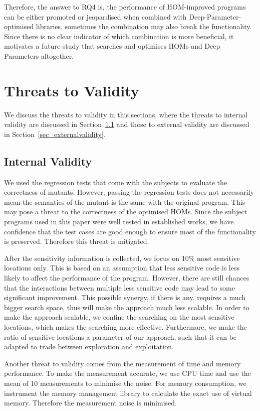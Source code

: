 \documentclass[oribibl]{llncs}
\begin{document}
Therefore, the answer to RQ4 is, the performance of HOM-improved programs can be either promoted or jeopardised when combined with Deep-Parameter-optimised libraries, sometimes the combination may also break the functionality.
Since there is no clear indicator of which combination is more beneficial, it motivates a future study that searches and optimises HOMs and Deep Parameters altogether.

\section{Threats to Validity}
\label{sec_threat}

We discuss the threats to validity in this sections, where the threats to internal validity are discussed in Section~\ref{sec_internalvalidity} and those to external validity are discussed in Section~\ref{sec_externalvalidity}.

\subsection{Internal Validity}
\label{sec_internalvalidity}

We used the regression tests that come with the subjects to evaluate the correctness of mutants.
However, passing the regression tests does not necessarily mean the semantics of the mutant is the same with the original program.
This may pose a threat to the correctness of the optimised HOMs.
Since the subject programs used in this paper were well tested in established works, we have confidence that the test cases are good enough to ensure most of the functionality is preserved.
Therefore this threat is mitigated.

After the sensitivity information is collected, we focus on 10\% most sensitive locations only.
This is based on an assumption that less sensitive code is less likely to affect the performance of the program.
However, there are still chances that the interactions between multiple less sensitive code may lead to some significant improvement.
This possible synergy, if there is any, requires a much bigger search space, thus will make the approach much less scalable.
In order to make the approach scalable, we confine the searching on the most sensitive locations, which makes the searching more effective.
Furthermore, we make the ratio of sensitive locations a parameter of our approach, such that it can be adapted to trade between exploration and exploitation.

Another threat to validity comes from the measurement of time and memory performance.
To make the measurement accurate, we use CPU time and use the mean of 10 measurements to minimise the noise.
For memory consumption, we instrument the memory management library to calculate the exact use of virtual memory.
Therefore the measurement noise is minimised.
\end{document}
